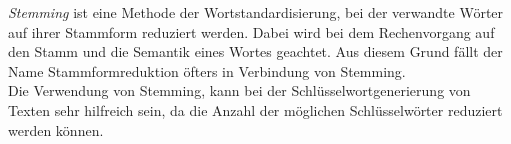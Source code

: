 			\textit{Stemming} ist eine Methode der Wortstandardisierung, bei der verwandte Wörter auf ihrer Stammform reduziert werden. Dabei wird bei dem Rechenvorgang auf den Stamm und die Semantik eines Wortes geachtet. Aus diesem Grund fällt der Name Stammformreduktion öfters in Verbindung von Stemming.\cite{eldesouki2009stemming}\\
			Die Verwendung von Stemming, kann bei der Schlüsselwortgenerierung von Texten sehr hilfreich sein, da die Anzahl der möglichen Schlüsselwörter reduziert werden können.


